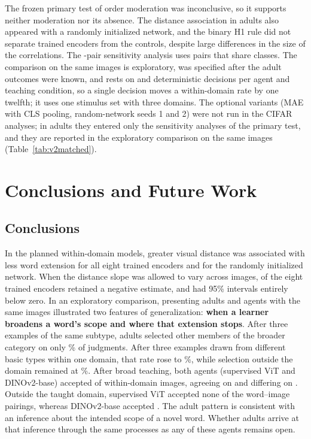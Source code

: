 \documentclass[11pt]{article}
\begin{document}
The frozen primary test of order moderation was inconclusive, so it supports neither moderation nor its absence. The distance association in adults also appeared with a randomly initialized network, and the binary H1 rule did not separate trained encoders from the controls, despite large differences in the size of the correlations. The \VtDallN-pair sensitivity analysis uses pairs that share classes. The comparison on the same images is exploratory, was specified after the adult outcomes were known, and rests on \VtXInN{} and \VtXOutN{} deterministic decisions per agent and teaching condition, so a single decision moves a within-domain rate by one twelfth; it uses one stimulus set with three domains. The optional variants (MAE with CLS pooling, random-network seeds 1 and 2) were not run in the CIFAR analyses; in adults they entered only the sensitivity analyses of the primary test, and they are reported in the exploratory comparison on the same images (Table~\ref{tab:v2matched}).


\section{Conclusions and Future Work}

\subsection{Conclusions}

In the planned within-domain models, greater visual distance was associated with less word extension for all eight trained encoders and for the randomly initialized network. When the distance slope was allowed to vary across images, \VcImgTrSameSignWord{} of the eight trained encoders retained a negative estimate, and \VcImgTrExclWord{} had 95\% intervals entirely below zero. In an exploratory comparison, presenting adults and agents with the same images illustrated two features of generalization: \textbf{when a learner broadens a word’s scope and where that extension stops}. After three examples of the same subtype, adults selected other members of the broader category on only \VcXSameSubPct\% of judgments. After three examples drawn from different basic types within one domain, that rate rose to \VtXBroadPct\%, while selection outside the domain remained at \VtXOutBroadPct\%. After broad teaching, both agents (supervised ViT and DINOv2-base) accepted \VtXViTIn{} of \VtXInN{} within-domain images, agreeing on \VdAgreeWord{} and differing on \VdDifferWord. Outside the taught domain, supervised ViT accepted none of the \VtXOutN{} word--image pairings, whereas DINOv2-base accepted \VtXDinoBOut. The adult pattern is consistent with an inference about the intended scope of a novel word. Whether adults arrive at that inference through the same processes as any of these agents remains open.
\end{document}

